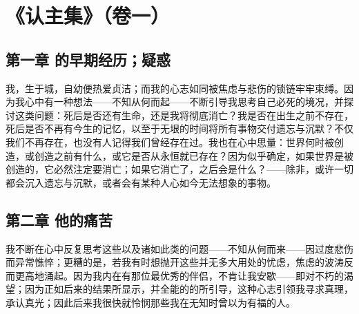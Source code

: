 

\section{《认主集》（卷一）}


\subsection{第一章 的早期经历；疑惑}

我，生于城，自幼便热爱贞洁；而我的心志如同被焦虑与悲伤的锁链牢牢束缚。因为我心中有一种想法——不知从何而起——不断引导我思考自己必死的境况，并探讨这类问题：死后是否还有生命，还是我将彻底消亡？我是否在出生之前不存在，死后是否不再有今生的记忆，以至于无垠的时间将所有事物交付遗忘与沉默？不仅我们不再存在，也没有人记得我们曾经存在过。我也在心中思量：世界何时被创造，或创造之前有什么，或它是否从永恒就已存在？因为似乎确定，如果世界是被创造的，它必然注定要消亡；如果它消亡了，之后会是什么？——除非，或许一切都会沉入遗忘与沉默，或者会有某种人心如今无法想象的事物。\par


\subsection{第二章 他的痛苦}

我不断在心中反复思考这些以及诸如此类的问题——不知从何而来——因过度悲伤而异常憔悴；更糟的是，若我有时想抛开这些并无多大用处的忧虑，焦虑的波涛反而更高地涌起。因为我内在有那位最优秀的伴侣，不肯让我安歇——即对不朽的渴望；因为正如后来的结果所显示，并全能的的所引导，这种心志引领我寻求真理，承认真光；因此后来我很快就怜悯那些我在无知时曾以为有福的人。\par


